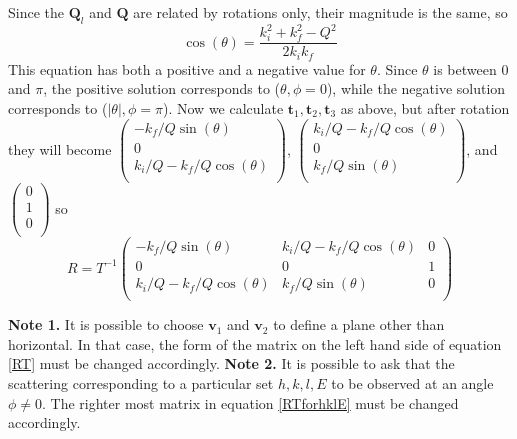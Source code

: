 \documentclass[prb]{revtex4}%
\begin{document}
Since the $\textbf{Q}_l$ and $\textbf{Q}$ are related by rotations only, their magnitude is the same, so
\begin{equation}
    \cos(\theta) = \frac{k^2_i + k^2_f - Q^2}{2 k_i k_f}
\end{equation}
This equation has both a positive  and a negative value for $\theta$. Since $\theta$
is between 0 and $\pi$, the positive solution corresponds to ($\theta, \phi=0$), while the
negative solution corresponds to ($|\theta|, \phi=\pi$).
Now we calculate $\textbf{t}_1, \textbf{t}_2, \textbf{t}_3$ as above, but after rotation they will become
$\left(
   \begin{array}{c}
     -k_f/Q \sin(\theta) \\
     0 \\
     k_i/Q-k_f/Q \cos(\theta) \\
   \end{array}
 \right)$, $\left(
   \begin{array}{c}
     k_i/Q-k_f/Q \cos(\theta) \\
     0 \\
     k_f/Q \sin(\theta) \\
   \end{array}
 \right)$, and $\left(
   \begin{array}{c}
     0 \\
     1 \\
     0 \\
   \end{array}
 \right)$
so
\begin{equation}\label{RTforhklE}
    R=T^{-1} \left(
               \begin{array}{ccc}
                 -k_f/Q \sin(\theta) & k_i/Q-k_f/Q \cos(\theta) & 0 \\
                 0 & 0 & 1 \\
                  k_i/Q-k_f/Q \cos(\theta) & k_f/Q \sin(\theta) & 0 \\
               \end{array}
             \right)
\end{equation}

\textbf{Note 1.} It is possible to choose $\textbf{v}_1$ and $\textbf{v}_2$ to define a plane
other than horizontal. In that case, the form of the matrix on the left hand side of equation
\ref{RT} must be changed accordingly.
\textbf{Note 2.} It is possible to ask that the scattering corresponding to a particular
set $h, k, l, E$ to be observed at an angle $\phi\neq0$. The righter most matrix in
equation \ref{RTforhklE} must be changed accordingly.
\end{document}
